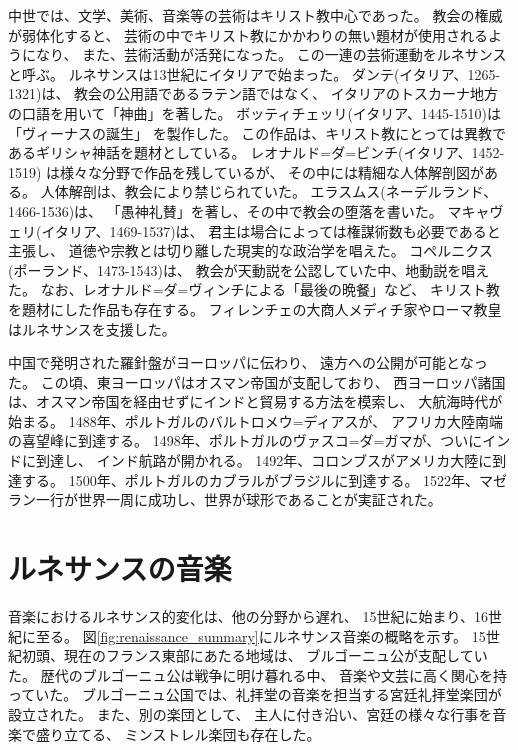 \documentclass[a4j]{jarticle}
\begin{document}
中世では、文学、美術、音楽等の芸術はキリスト教中心であった。
教会の権威が弱体化すると、
芸術の中でキリスト教にかかわりの無い題材が使用されるようになり、
また、芸術活動が活発になった。
この一連の芸術運動をルネサンスと呼ぶ。
ルネサンスは13世紀にイタリアで始まった。
ダンテ(イタリア、1265-1321)は、
教会の公用語であるラテン語ではなく、
イタリアのトスカーナ地方の口語を用いて「神曲」を著した。
ボッティチェッリ(イタリア、1445-1510)は「ヴィーナスの誕生」
を製作した。
この作品は、キリスト教にとっては異教であるギリシャ神話を題材としている。
レオナルド=ダ=ビンチ(イタリア、1452-1519)
は様々な分野で作品を残しているが、
その中には精細な人体解剖図がある。
人体解剖は、教会により禁じられていた。
エラスムス(ネーデルランド、1466-1536)は、
「愚神礼賛」を著し、その中で教会の堕落を書いた。
マキャヴェリ(イタリア、1469-1537)は、
君主は場合によっては権謀術数も必要であると主張し、
道徳や宗教とは切り離した現実的な政治学を唱えた。
コペルニクス(ポーランド、1473-1543)は、
教会が天動説を公認していた中、地動説を唱えた。
なお、レオナルド=ダ=ヴィンチによる「最後の晩餐」など、
キリスト教を題材にした作品も存在する。
フィレンチェの大商人メディチ家やローマ教皇はルネサンスを支援した。

中国で発明された羅針盤がヨーロッパに伝わり、
遠方への公開が可能となった。
この頃、東ヨーロッパはオスマン帝国が支配しており、
西ヨーロッパ諸国は、オスマン帝国を経由せずにインドと貿易する方法を模索し、
大航海時代が始まる。
1488年、ポルトガルのバルトロメウ=ディアスが、
アフリカ大陸南端の喜望峰に到達する。
1498年、ポルトガルのヴァスコ=ダ=ガマが、ついにインドに到達し、
インド航路が開かれる。
1492年、コロンブスがアメリカ大陸に到達する。
1500年、ポルトガルのカブラルがブラジルに到達する。
1522年、マゼラン一行が世界一周に成功し、世界が球形であることが実証された。





\section{ルネサンスの音楽\label{sec:mus}}

音楽におけるルネサンス的変化は、他の分野から遅れ、
15世紀に始まり、16世紀に至る。
図\ref{fig:renaissance_summary}にルネサンス音楽の概略を示す。
15世紀初頭、現在のフランス東部にあたる地域は、
ブルゴーニュ公が支配していた。
歴代のブルゴーニュ公は戦争に明け暮れる中、
音楽や文芸に高く関心を持っていた。
ブルゴーニュ公国では、礼拝堂の音楽を担当する宮廷礼拝堂楽団が設立された。
また、別の楽団として、
主人に付き沿い、宮廷の様々な行事を音楽で盛り立てる、
ミンストレル楽団も存在した。
\end{document}
